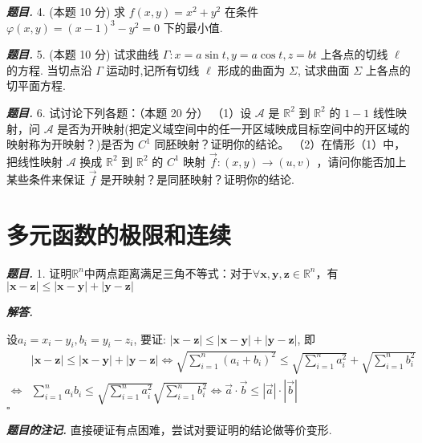 \documentclass[10pt, a4paper, oneside]{ctexart}
\newenvironment{problem}{\begin{framed}\par\noindent\textbf{\textit{题目. }}}{\end{framed}\par}
\newenvironment{solution}{%
  \par\noindent\textbf{\textit{解答. }}\ignorespaces
}{%
  \hfill\ensuremath{\square}\par %
}
\newenvironment{note}{\par\noindent\textbf{\textit{题目的注记. }}\ignorespaces}{\par}
\begin{document}
\begin{problem}
4. (本题 10 分) 求 $f(x, y)=x^2+y^2$ 在条件 $\varphi(x, y)=(x-1)^3-y^2=0$ 下的最小值.
\end{problem}

\begin{problem}
5. (本题 10 分) 试求曲线 $\Gamma: x=a \sin t, y=a \cos t, z=b t$ 上各点的切线 $\ell$ 的方程. 当切点沿 $\Gamma$ 运动时,记所有切线 $\ell$ 形成的曲面为 $\Sigma$, 试求曲面 $\Sigma$ 上各点的切平面方程.
\end{problem}

\begin{problem}
6. 试讨论下列各题：（本题 20 分）
（1）设 $\mathcal{A}$ 是 $\mathbb{R}^2$ 到 $\mathbb{R}^2$ 的 $1-1$ 线性映射，问 $\mathcal{A}$ 是否为开映射(把定义域空间中的任一开区域映成目标空间中的开区域的映射称为开映射？)是否为 $C^1$ 同胚映射？证明你的结论。
（2）在情形（1）中，把线性映射 $\mathcal{A}$ 换成 $\mathbb{R}^2$ 到 $\mathbb{R}^2$ 的 $C^1$ 映射 $\vec{f}:(x, y) \rightarrow(u, v)$ ，请问你能否加上某些条件来保证 $\vec{f}$ 是开映射？是同胚映射？证明你的结论.        
\end{problem}

\section{多元函数的极限和连续}

\begin{problem}
1. 证明$\mathbb{R}^n$中两点距离满足三角不等式：对于$\forall \bm{x},\bm{y},\bm{z}\in \mathbb{R}^n$，有$|\bm{x}-\bm{z}|\leq |\bm{x}-\bm{y}|+|\bm{y}-\bm{z}|$
\end{problem}

\begin{solution}
设$a_i=x_i-y_i, b_i=y_i-z_i$, 要证: $|\bm{x}-\bm{z}|\leq |\bm{x}-\bm{y}|+|\bm{y}-\bm{z}|$, 即
\begin{align*}
    &|\bm{x}-\bm{z}|\leq |\bm{x}-\bm{y}|+|\bm{y}-\bm{z}| \iff \sqrt{\sum_{i=1}^n (a_i+b_i)^2}\leq \sqrt{\sum_{i=1}^n a_i^2}+\sqrt{\sum_{i=1}^n b_i^2}\\\iff& \sum_{i=1}^n a_ib_i\leq \sqrt{\sum_{i=1}^n a_i^2}\sqrt{\sum_{i=1}^n b_i^2}\iff \vec{a}\cdot \vec{b}\leq |\vec{a}|\cdot|\vec{b}|
\end{align*}
\end{solution}
\begin{note}
    直接硬证有点困难，尝试对要证明的结论做等价变形.
\end{note}
\end{document}
